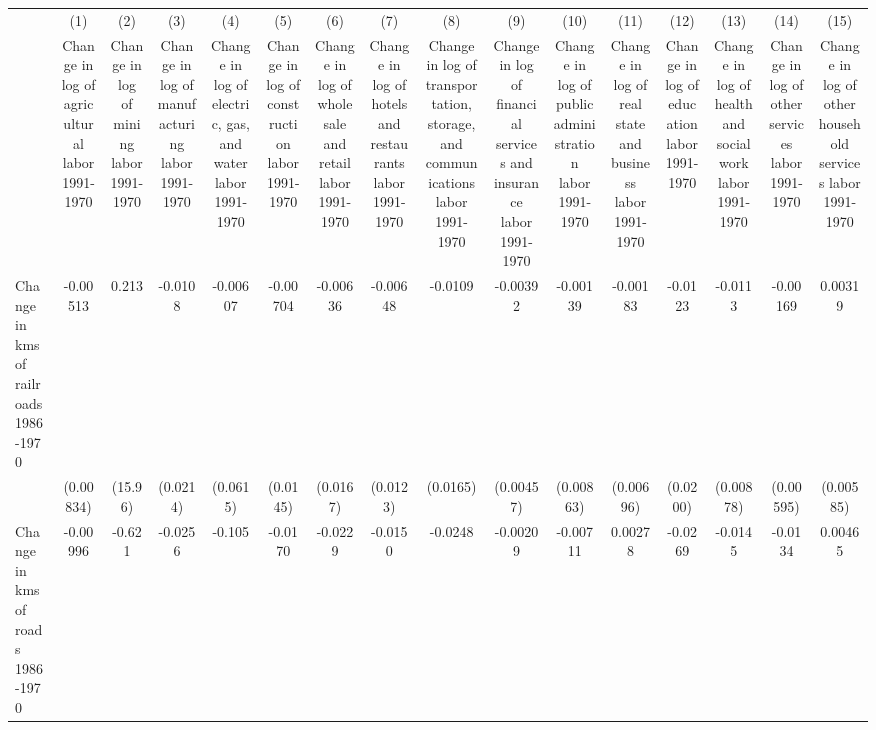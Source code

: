 {
\def\sym#1{\ifmmode^{#1}\else\(^{#1}\)\fi}
\begin{tabular}{l*{15}{c}}
\hline\hline
                &\multicolumn{1}{c}{(1)}&\multicolumn{1}{c}{(2)}&\multicolumn{1}{c}{(3)}&\multicolumn{1}{c}{(4)}&\multicolumn{1}{c}{(5)}&\multicolumn{1}{c}{(6)}&\multicolumn{1}{c}{(7)}&\multicolumn{1}{c}{(8)}&\multicolumn{1}{c}{(9)}&\multicolumn{1}{c}{(10)}&\multicolumn{1}{c}{(11)}&\multicolumn{1}{c}{(12)}&\multicolumn{1}{c}{(13)}&\multicolumn{1}{c}{(14)}&\multicolumn{1}{c}{(15)}\\
                &\multicolumn{1}{c}{Change in log of agricultural labor 1991-1970}&\multicolumn{1}{c}{Change in log of mining labor 1991-1970}&\multicolumn{1}{c}{Change in log of manufacturing labor 1991-1970}&\multicolumn{1}{c}{Change in log of electric, gas, and water labor 1991-1970}&\multicolumn{1}{c}{Change in log of construction labor 1991-1970}&\multicolumn{1}{c}{Change in log of wholesale and retail labor 1991-1970}&\multicolumn{1}{c}{Change in log of hotels and restaurants labor 1991-1970}&\multicolumn{1}{c}{Change in log of transportation, storage, and communications labor 1991-1970}&\multicolumn{1}{c}{Change in log of financial services and insurance labor 1991-1970}&\multicolumn{1}{c}{Change in log of public administration labor 1991-1970}&\multicolumn{1}{c}{Change in log of real state and business labor 1991-1970}&\multicolumn{1}{c}{Change in log of education labor 1991-1970}&\multicolumn{1}{c}{Change in log of health and social work labor 1991-1970}&\multicolumn{1}{c}{Change in log of other services labor 1991-1970}&\multicolumn{1}{c}{Change in log of other household services labor 1991-1970}\\
\hline
Change in kms of railroads 1986-1970& -0.00513         &    0.213         &  -0.0108         & -0.00607         & -0.00704         & -0.00636         & -0.00648         &  -0.0109         & -0.00392         & -0.00139         & -0.00183         &  -0.0123         &  -0.0113         & -0.00169         &  0.00319         \\
                &(0.00834)         &  (15.96)         & (0.0214)         & (0.0615)         & (0.0145)         & (0.0167)         & (0.0123)         & (0.0165)         &(0.00457)         &(0.00863)         &(0.00696)         & (0.0200)         &(0.00878)         &(0.00595)         &(0.00585)         \\
[1em]
Change in kms of roads 1986-1970& -0.00996         &   -0.621         &  -0.0256         &   -0.105         &  -0.0170         &  -0.0229         &  -0.0150         &  -0.0248         & -0.00209         & -0.00711         &  0.00278         &  -0.0269         &  -0.0145         &  -0.0134         &  0.00465         \\

\end{tabular}}
